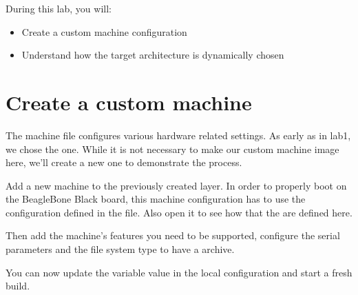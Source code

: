 
During this lab, you will:
\begin{itemize}
  \item Create a custom machine configuration
  \item Understand how the target architecture is dynamically chosen
\end{itemize}

\section{Create a custom machine}

The machine file configures various hardware related settings. As early as in
lab1, we chose the  one. While it is not necessary to
make our custom machine image here, we'll create a new one to demonstrate the
process.

Add a new  machine to the previously created layer. In order to
properly boot on the BeagleBone Black board, this machine configuration has to
use the configuration defined in the  file. Also open it to see how
that the  are defined here.

Then add the machine's features you need to be supported, configure the
serial parameters and the file system type to have a 
archive.

You can now update the  variable value in the local configuration
and start a fresh build.

\section{}

